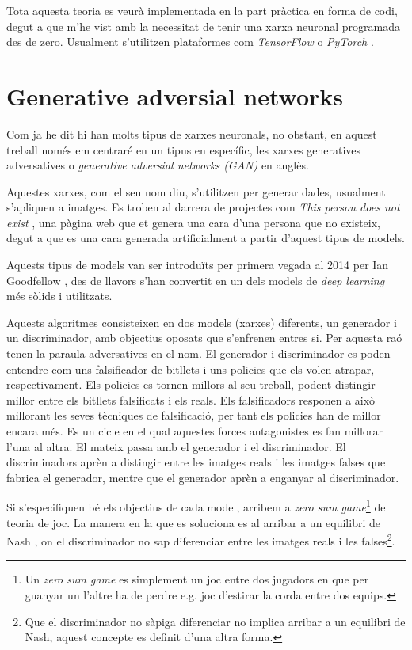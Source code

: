 Tota aquesta teoria es veurà implementada en la part pràctica en forma de codi, degut a que m'he vist amb la necessitat de tenir una xarxa neuronal programada des de zero. Usualment s'utilitzen plataformes com \textit{TensorFlow} \cite{tensorflow2015-whitepaper} o \textit{PyTorch} \cite{pytorch_2019}.

\section{Generative adversial networks}
Com ja he dit hi han molts tipus de xarxes neuronals, no obstant, en aquest treball només em centraré en un tipus en específic, les xarxes generatives adversatives o \textit{generative adversial networks (GAN)} en anglès.

Aquestes xarxes, com el seu nom diu, s'utilitzen per generar dades, usualment s'apliquen a imatges. Es troben al darrera de projectes com \textit{This person does not exist} \cite{styleGAN, this_person_does_not_exist}, una pàgina web que et genera una cara d'una persona que no existeix, degut a que es una cara generada artificialment a partir d'aquest tipus de models.

Aquests tipus de models van ser introduïts per primera vegada al 2014 per Ian Goodfellow \cite{GAN2014}, des de llavors s'han convertit en un dels models de \textit{deep learning} més sòlids i utilitzats. 

Aquests algoritmes consisteixen en dos models (xarxes) diferents, un generador i un discriminador, amb objectius oposats que s'enfrenen entres si. Per aquesta raó tenen la paraula adversatives en el nom. El generador i discriminador es poden entendre com uns falsificador de bitllets i uns policies que els volen atrapar, respectivament. Els policies es tornen millors al seu treball, podent distingir millor entre els bitllets falsificats i els reals. Els falsificadors responen a això millorant les seves tècniques de falsificació, per tant els policies han de millor encara més. Es un cicle en el qual aquestes forces antagonistes es fan millorar l'una al altra. El mateix passa amb el generador i el discriminador. El discriminadors aprèn a distingir entre les imatges reals i les imatges falses que fabrica el generador, mentre que el generador aprèn a enganyar al discriminador. 

Si s'especifiquen bé els objectius de cada model, arribem a \textit{zero sum game}\footnote{Un \textit{zero sum game} es simplement un joc entre dos jugadors en que per guanyar un l'altre ha de perdre e.g. joc d'estirar la corda entre dos equips.} de teoria de joc. La manera en la que es soluciona es al arribar a un equilibri de Nash \cite{QGAN_exp}, on el discriminador no sap diferenciar entre les imatges reals i les falses\footnote{Que el discriminador no sàpiga diferenciar no implica arribar a un equilibri de Nash, aquest concepte es definit d'una altra forma.}.

